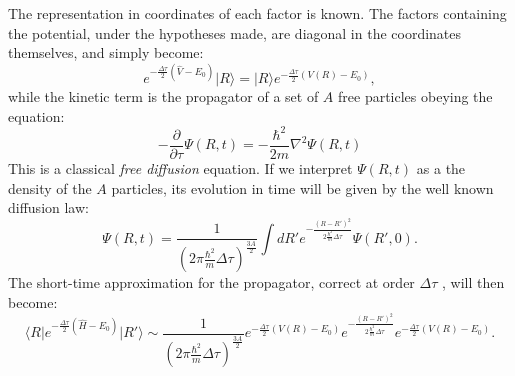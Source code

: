 The representation in coordinates of each factor is known. The factors containing the potential, under the hypotheses made, are diagonal in the coordinates themselves, and simply become:
\begin{equation}
e^{-\frac{\Delta\tau}{2}(\hat{V}-E_0)}\vert R\rangle = |R\rangle e^{-\frac{\Delta\tau}{2}(V(R)-E_0)},
\end{equation}
while the kinetic term is the propagator of a set of $A$ free particles obeying the equation:
\begin{equation}
-\frac{\partial}{\partial\tau}\Psi(R,t)=-\frac{\hbar^2}{2m}\nabla^2\Psi(R,t)\label{diffusion_eq}
\end{equation}
This is a classical {\it free diffusion} equation. If we interpret $\Psi(R,t)$ as a the density of the $A$ particles, its evolution in time will be given by the well known diffusion law:
\begin{equation}
\Psi(R,t)=\frac{1}{(2\pi\frac{\hbar^2}{m}\Delta\tau)^\frac{3A}{2}}\int dR'e^{-\frac{(R-R')^2}{2\frac{\hbar^2}{m}\Delta\tau}}\Psi(R',0).\label{free_propagator}
\end{equation}
The short-time approximation for the propagator, correct at order $\Delta\tau$ , will then become:
\begin{equation}
\langle R\vert e^{-\frac{\Delta\tau}{2}(\hat{H}-E_0)}\vert R'\rangle\sim\frac{1}{(2\pi\frac{\hbar^2}{m}\Delta\tau)^\frac{3A}{2}}e^{-\frac{\Delta\tau}{2}(V(R)-E_0)} e^{-\frac{(R-R')^2}{2\frac{\hbar^2}{m}\Delta\tau}}e^{-\frac{\Delta\tau}{2}(V(R)-E_0)}.\label{propagator}
\end{equation}

